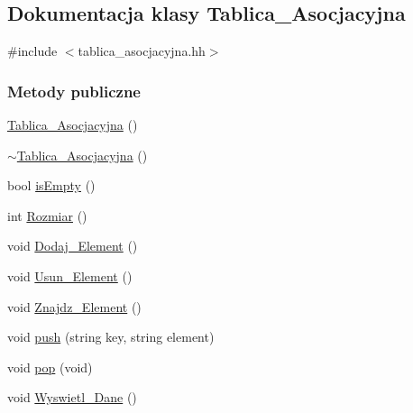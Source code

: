 \hypertarget{class_tablica___asocjacyjna}{\subsection{\-Dokumentacja klasy \-Tablica\-\_\-\-Asocjacyjna}
\label{class_tablica___asocjacyjna}
}


{\ttfamily \#include $<$tablica\-\_\-asocjacyjna.\-hh$>$}

\subsubsection*{\-Metody publiczne}
\begin{DoxyCompactItemize}
\item 
\hyperlink{class_tablica___asocjacyjna_ad5d13fb22675dabeb7bcdb2f5b55b79f}{\-Tablica\-\_\-\-Asocjacyjna} ()
\item 
\hyperlink{class_tablica___asocjacyjna_abb971aa2dfd76dc0fa6e16cb5c5da1bf}{$\sim$\-Tablica\-\_\-\-Asocjacyjna} ()
\item 
bool \hyperlink{class_tablica___asocjacyjna_ac82562a56d46b194775895d15c1e1e99}{is\-Empty} ()
\item 
int \hyperlink{class_tablica___asocjacyjna_a3058d4b413ae67c912bc824a048b5650}{\-Rozmiar} ()
\item 
void \hyperlink{class_tablica___asocjacyjna_a69bfbf4d9bf16309eec88cd41958baf2}{\-Dodaj\-\_\-\-Element} ()
\item 
void \hyperlink{class_tablica___asocjacyjna_aa56ed430bad8a52498ba2a0fd2ea3f1e}{\-Usun\-\_\-\-Element} ()
\item 
void \hyperlink{class_tablica___asocjacyjna_a025780c9461b4bc91e0969e9710effcd}{\-Znajdz\-\_\-\-Element} ()
\item 
void \hyperlink{class_tablica___asocjacyjna_a7e6d8c64d17c165c9ef0cfb0a4218c9a}{push} (string key, string element)
\item 
void \hyperlink{class_tablica___asocjacyjna_a0156f8fce430ab99008bd1751e18741d}{pop} (void)
\item 
void \hyperlink{class_tablica___asocjacyjna_ac264d7a74bd8d1450acf81d26f1b114c}{\-Wyswietl\-\_\-\-Dane} ()
\end{DoxyCompactItemize}

